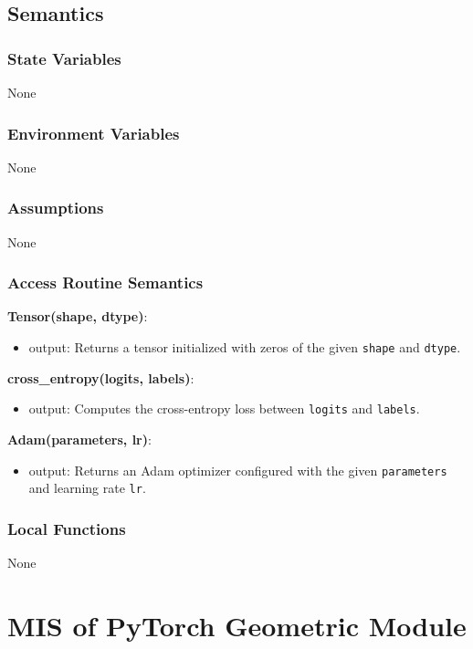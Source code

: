 \documentclass[12pt, titlepage]{article}
\begin{document}
\subsection{Semantics}

\subsubsection{State Variables}
None

\subsubsection{Environment Variables}
None

\subsubsection{Assumptions}
None

\subsubsection{Access Routine Semantics}

\textbf{Tensor(shape, dtype)}:
\begin{itemize}
  \item output: Returns a tensor initialized with zeros of the given \texttt{shape} and \texttt{dtype}.
\end{itemize}

\textbf{cross\_entropy(logits, labels)}:
\begin{itemize}
  \item output: Computes the cross-entropy loss between \texttt{logits} and \texttt{labels}.
\end{itemize}

\textbf{Adam(parameters, lr)}:
\begin{itemize}
  \item output: Returns an Adam optimizer configured with the given \texttt{parameters} and learning rate \texttt{lr}.
\end{itemize}

\subsubsection{Local Functions}
None



\section{MIS of PyTorch Geometric Module} \label{PyGModule}
\end{document}
